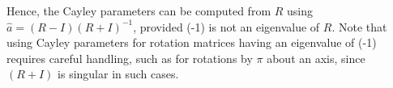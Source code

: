 Hence, the Cayley parameters can be computed from \( R \) using \( \boxed{ \hat{a} = (R - I){(R + I)}^{-1} } \), provided (-1) is not an eigenvalue of \( R \).
Note that using Cayley parameters for rotation matrices having an eigenvalue of (-1) requires careful handling, such as for rotations by \( \pi \) about an axis, since \( (R + I) \) is singular in such cases.
